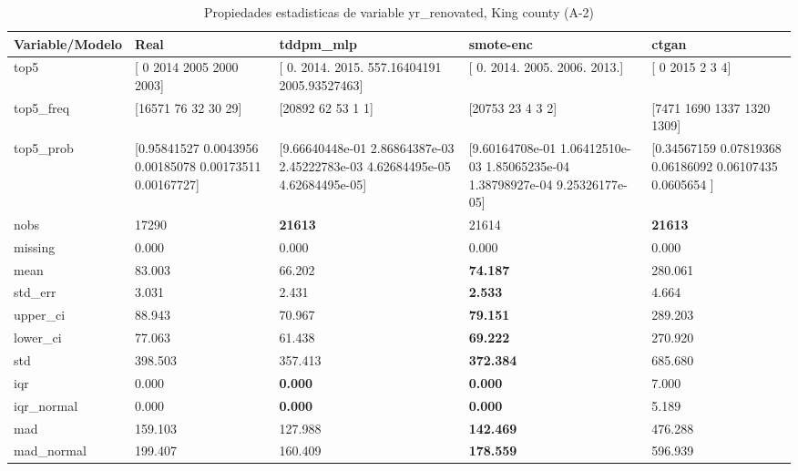 \begin{table}[H]
\centering
\fontsize{8}{14}\selectfont
\caption{Propiedades  estadisticas de variable yr\_renovated, King county (A-2)}
\label{table-stats-king county-a-2-yr_renovated}
\begin{tabular}{|l|m{10em}|m{10em}|m{10em}|m{10em}|}
\hline
 \rowcolor[gray]{0.8}
Variable/Modelo & Real & tddpm\_mlp & smote-enc & ctgan \\
\hline top5 & [   0 2014 2005 2000 2003] & [   0.         2014.         2015.          557.16404191 2005.93527463] & [   0. 2014. 2005. 2006. 2013.] & [   0 2015    2    3    4] \\
\hline top5\_freq & [16571    76    32    30    29] & [20892    62    53     1     1] & [20753    23     4     3     2] & [7471 1690 1337 1320 1309] \\
\hline top5\_prob & [0.95841527 0.0043956  0.00185078 0.00173511 0.00167727] & [9.66640448e-01 2.86864387e-03 2.45222783e-03 4.62684495e-05
 4.62684495e-05] & [9.60164708e-01 1.06412510e-03 1.85065235e-04 1.38798927e-04
 9.25326177e-05] & [0.34567159 0.07819368 0.06186092 0.06107435 0.0605654 ] \\
\hline nobs & 17290 & \bfseries 21613 & \cellcolor[rgb]{0.9, 0.54, 0.52} 21614 & \bfseries 21613 \\
\hline missing & 0.000 & 0.000 & 0.000 & 0.000 \\
\hline mean & 83.003 & 66.202 & \bfseries 74.187 & \cellcolor[rgb]{0.9, 0.54, 0.52} 280.061 \\
\hline std\_err & 3.031 & 2.431 & \bfseries 2.533 & \cellcolor[rgb]{0.9, 0.54, 0.52} 4.664 \\
\hline upper\_ci & 88.943 & 70.967 & \bfseries 79.151 & \cellcolor[rgb]{0.9, 0.54, 0.52} 289.203 \\
\hline lower\_ci & 77.063 & 61.438 & \bfseries 69.222 & \cellcolor[rgb]{0.9, 0.54, 0.52} 270.920 \\
\hline std & 398.503 & 357.413 & \bfseries 372.384 & \cellcolor[rgb]{0.9, 0.54, 0.52} 685.680 \\
\hline iqr & 0.000 & \bfseries 0.000 & \bfseries 0.000 & \cellcolor[rgb]{0.9, 0.54, 0.52} 7.000 \\
\hline iqr\_normal & 0.000 & \bfseries 0.000 & \bfseries 0.000 & \cellcolor[rgb]{0.9, 0.54, 0.52} 5.189 \\
\hline mad & 159.103 & 127.988 & \bfseries 142.469 & \cellcolor[rgb]{0.9, 0.54, 0.52} 476.288 \\
\hline mad\_normal & 199.407 & 160.409 & \bfseries 178.559 & \cellcolor[rgb]{0.9, 0.54, 0.52} 596.939 \\

\end{tabular}
\end{table}
